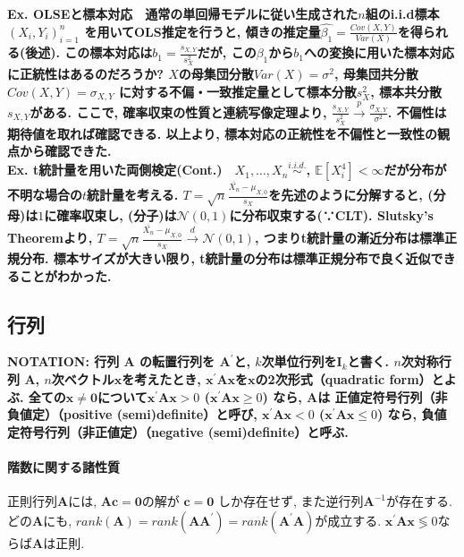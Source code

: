 \documentclass[paper=a4paper,fontsize=10pt]{jlreq}
\begin{document}
\rmfamily\mcfamily\bfseries{Ex. OLSEと標本対応}\mdseries　通常の単回帰モデルに従い生成された$n$組のi.i.d標本$(X_i, Y_i)_{i=1}^{n}$ を用いてOLS推定を行うと, 傾きの推定量$\hat{\beta_1}=\frac{Cov(X,Y)}{Var(X)}$を得られる(後述). この\rmfamily\mcfamily\bfseries{標本対応}\mdseries は$b_1=\frac{s_{X,Y}}{s^{2}_{X}}$だが, この$\beta_1$から$b_1$への変換に用いた標本対応に正統性はあるのだろうか? $X$の母集団分散$Var(X)=\sigma^2$, 母集団共分散$Cov(X,Y)=\sigma_{X,Y}$ に対する不偏・一致推定量として標本分散$s^2_X$, 標本共分散$s_{X,Y}$がある. ここで, 確率収束の性質と連続写像定理より, $\frac{s_{X,Y}}{s^{2}_{X}} \overset{p}{\to} \frac{\sigma_{X,Y}}{\sigma^2}$. 不偏性は期待値を取れば確認できる. 以上より, 標本対応の正統性を不偏性と一致性の観点から確認できた.\\

\rmfamily\mcfamily\bfseries{Ex. t統計量を用いた両側検定(Cont.)}\mdseries　$X_1, \dots, X_n \overset{i.i.d.}{\sim}$, $\mathbb{E}[X_i^4]<\infty$だが分布が不明な場合の$t$統計量を考える. $T=\sqrt{n} \frac{\bar{X_n}-\mu_{X,0}}{s_X}$を先述のように分解すると, (分母)は$1$に確率収束し, (分子)は$\mathcal{N}(0,1)$に分布収束する(∵CLT). Slutsky's Theoremより, $T=\sqrt{n} \frac{\bar{X_n}-\mu_{X,0}}{s_X} \overset{d}{\to} \mathcal{N}(0, 1)$, つまり\rmfamily\mcfamily\bfseries{t統計量の漸近分布は標準正規分布}\mdseries . 標本サイズが大きい限り, t統計量の分布は標準正規分布で良く近似できることがわかった.\\

\subsection{行列}
\rmfamily\mcfamily\bfseries{NOTATION}\mdseries : 行列 $\mathbf{A}$ の転置行列を $\mathbf{A}^{\prime}$と, $k$次単位行列を$\mathbf{I}_k$と書く. $n$次対称行列 $\mathbf{A}$, $n$次ベクトル$\mathbf{x}$を考えたとき, $\mathbf{x}^\prime\mathbf{A}\mathbf{x}$を$\mathbf{x}$の\rmfamily\mcfamily\bfseries{2次形式（quadratic form）}\mdseries とよぶ. 全ての$\mathbf{x} \neq  \mathbf{0}$について$\mathbf{x}^\prime\mathbf{A}\mathbf{x}>0$ ($\mathbf{x}^\prime\mathbf{A}\mathbf{x}\geq 0$) なら, $\mathbf{A}$は \rmfamily\mcfamily\bfseries{正値定符号行列（非負値定）（positive (semi)definite）}\mdseries と呼び,  $\mathbf{x}^\prime\mathbf{A}\mathbf{x}<0$ ($\mathbf{x}^\prime\mathbf{A}\mathbf{x}\leq0$) なら, \rmfamily\mcfamily\bfseries{負値定符号行列（非正値定）（negative (semi)definite）}\mdseries と呼ぶ. \\

\paragraph{階数に関する諸性質}
正則行列$\mathbf{A}$には, $\mathbf{A}\mathbf{c}=\mathbf{0}$の解が $\mathbf{c}=\mathbf{0}$ しか存在せず, また逆行列$\mathbf{A}^{-1}$が存在する. どの$\mathbf{A}$にも, $rank(\mathbf{A})=rank(\mathbf{A}\mathbf{A}^\prime)=rank(\mathbf{A}^\prime\mathbf{A})$が成立する. $\mathbf{x}^\prime\mathbf{A}\mathbf{x}\lessgtr0$ならば$\mathbf{A}$は正則.\\
\end{document}

